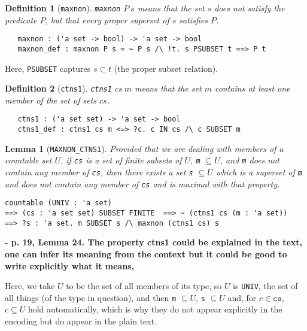 \documentclass[a4paper]{article}
\newtheorem{lemma}{Lemma}
\newtheorem{definition}{Definition}
\begin{document}
\begin{definition}[\texttt{maxnon}]\label{maxnon}
\texttt{maxnon} $P\ s$ means that the set $s$ does not satisfy the 
predicate $P$, but that every proper superset of $s$ satisfies $P$.
\begin{verbatim}
   maxnon : ('a set -> bool) -> 'a set -> bool
   maxnon_def : maxnon P s = ~ P s /\ !t. s PSUBSET t ==> P t 
\end{verbatim}
\end{definition}

Here, \texttt{PSUBSET} captures $s \subset t$ (the proper subset relation).

\begin{definition}[\texttt{ctns1}]\label{ctns1}
\texttt{ctns1} $cs\ m$ means that the set $m$ contains at least one member
of the set of sets $cs$.
\begin{verbatim}
   ctns1 : ('a set set) -> 'a set -> bool
   ctns1_def : ctns1 cs m <=> ?c. c IN cs /\ c SUBSET m
\end{verbatim}
\end{definition}

\begin{lemma}[\texttt{MAXNON\_CTNS1}] \label{MAXNON-CTNS1} Provided
  that we are dealing with members of a countable set $U$, if
  \texttt{cs} is a set of finite subsets of $U$,
  \texttt{m} $\subseteq U$, and \texttt{m}
  does not contain any member of \texttt{cs},
  then there exists a set \texttt{s} $\subseteq U$ 
  which is a superset of \texttt{m} and does not contain any
  member of \texttt{cs} and is maximal with that property.
\begin{verbatim}
countable (UNIV : 'a set) 
==> (cs : 'a set set) SUBSET FINITE  ==> ~ (ctns1 cs (m : 'a set)) 
==> ?s : 'a set. m SUBSET s /\ maxnon (ctns1 cs) s
\end{verbatim}
\end{lemma}

\textbf{- p. 19, Lemma 24. The property ctns1 could be explained in the text,
one can infer its meaning from the context but it could be good
to write explicitly what it means,
}

Here, we take $U$ to be the set of all
members of its type, so $U$ is \texttt{UNIV}, the set of all things
(of the type in question), and then
\texttt{m} $\subseteq U$, \texttt{s} $\subseteq U$ and,
for $c \in \texttt{cs}$, $c \subseteq U$ hold automatically, which is
why they do not appear explicitly in the encoding but do appear in the
plain text.
\end{document}
